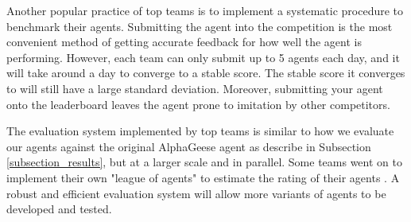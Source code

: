 Another popular practice of top teams is to implement a systematic procedure to benchmark their agents. Submitting the agent into the competition is the most convenient method of getting accurate feedback for how well the agent is performing. However, each team can only submit up to 5 agents each day, and it will take around a day to converge to a stable score. The stable score it converges to will still have a large standard deviation. Moreover, submitting your agent onto the leaderboard leaves the agent prone to imitation by other competitors.

The evaluation system implemented by top teams is similar to how we evaluate our agents against the original AlphaGeese agent as describe in Subsection \ref{subsection_results}, but at a larger scale and in parallel. Some teams went on to implement their own "league of agents" to estimate the rating of their agents \cite{sharing_ironbar}. A robust and efficient evaluation system will allow more variants of agents to be developed and tested.









